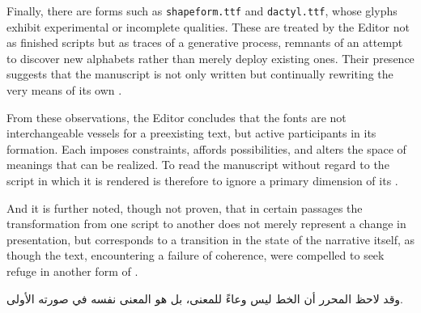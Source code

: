 {\medskip

Finally, there are forms such as \texttt{shapeform.ttf} and \texttt{dactyl.ttf},
whose glyphs exhibit experimental or incomplete qualities. These are treated by
the Editor not as finished scripts but as traces of a generative process,
remnants of an attempt to discover new alphabets rather than merely deploy
existing ones. Their presence suggests that the manuscript is not only written
but continually rewriting the very means of its own .

\medskip

From these observations, the Editor concludes that the fonts are not
interchangeable vessels for a preexisting text, but active participants in its
formation. Each imposes constraints, affords possibilities, and alters the space
of meanings that can be realized. To read the manuscript without regard to the
script in which it is rendered is therefore to ignore a primary dimension of its
.

\medskip

And it is further noted, though not proven, that in certain passages the
transformation from one script to another does not merely represent a change in
presentation, but corresponds to a transition in the state of the narrative
itself, as though the text, encountering a failure of coherence, were compelled
to seek refuge in another form of .

} %

\medskip

\begin{AR}
وقد لاحظ المحرر أن الخط ليس وعاءً للمعنى، بل هو المعنى نفسه في صورته الأولى.
\end{AR}
